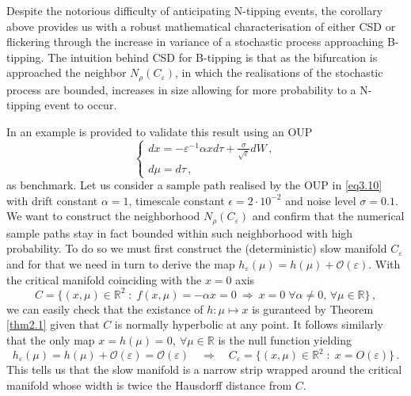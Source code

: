 \documentclass[../main.tex]{subfiles}
\begin{document}
Despite the notorious difficulty of anticipating N-tipping events, the corollary above provides us with a robust mathematical characterisation of either CSD or flickering through the increase in variance of a stochastic process approaching B-tipping.
The intuition behind CSD for B-tipping is that as the bifurcation is approached the neighbor $N_{\rho}(C_{\varepsilon})$, in which the realisations of the stochastic process are bounded, increases in size allowing for more probability to a N-tipping event to occur.
\begin{example}[label=ex3.3]{}{}
In \cite{Kuehn11} an example is provided to validate this result using an OUP
\begin{equation}\label{eq3.10}
   \begin{cases}
           dx = -\varepsilon^{-1}\alpha x d\tau + \frac{\sigma}{\sqrt{\varepsilon}}dW \,, \\
      d\mu = d\tau \,, 
   \end{cases}
\end{equation}
as benchmark.
Let us consider a sample path realised by the OUP in \eqref{eq3.10} with drift constant $\alpha=1$, timescale constant $\epsilon=2\cdot10^{-2}$ and noise level $\sigma=0.1$.
We want to construct the neighborhood $N_{\rho}(C_{\varepsilon})$ and confirm that the numerical sample paths stay in fact bounded within such neighborhood with high probability. 
To do so we must first construct the (deterministic) slow manifold $C_{\varepsilon}$ and for that we need in turn to derive the map $h_{\varepsilon}(\mu)=h(\mu)+\mathcal{O}(\varepsilon)$.
With the critical manifold coinciding with the $x=0$ axis 
\begin{equation*}
            C=\{(x,\mu)\in \mathbb{R}^{2}\;:\;f(x,\mu)=-\alpha x = 0\:\Rightarrow\: x=0\;\forall \alpha\neq0,\,\forall \mu\in \mathbb{R}\}\,,
\end{equation*}
we can easily check that the existance of $h:\mu\mapsto x$ is guranteed by Theorem \ref{thm2.1} given that $C$ is normally hyperbolic at any point.
It follows similarly that the only map $x=h(\mu)=0,\:\forall \mu\in \mathbb{R}$ is the null function yielding 
\begin{equation*}
                h_{\varepsilon}(\mu) = h(\mu) + \mathcal{O}(\varepsilon) = \mathcal{O}(\varepsilon)\quad\Longrightarrow\quad C_{\varepsilon}=\{(x,\mu)\in \mathbb{R}^{2}\;:\;x=O(\varepsilon)\}\,.
\end{equation*}
This tells us that the slow manifold is a narrow strip wrapped around the critical manifold whose width is twice the Hausdorff distance from $C$.

\end{example}
\end{document}
